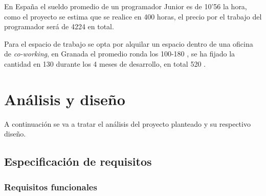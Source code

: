 En España el sueldo promedio de un programador Junior es de 10'56 \texteuro \cite{SueldoProgramador} la hora, como el proyecto se estima que se realice en 400 horas, el precio por el trabajo del programador será de 4224 \texteuro en total.

Para el espacio de trabajo se opta por alquilar un espacio dentro de una oficina de \textit{co-working}, en Granada el promedio ronda los 100-180 \texteuro \cite{OficinaCoworking}, se ha fijado la cantidad en 130 \texteuro durante los 4 meses de desarrollo, en total 520 \texteuro.

\section{Análisis y diseño}
\label{sec:analisis}

A continuación se va a tratar el análisis del proyecto planteado y su respectivo diseño.

\subsection{Especificación de requisitos}

\subsubsection{Requisitos funcionales}

